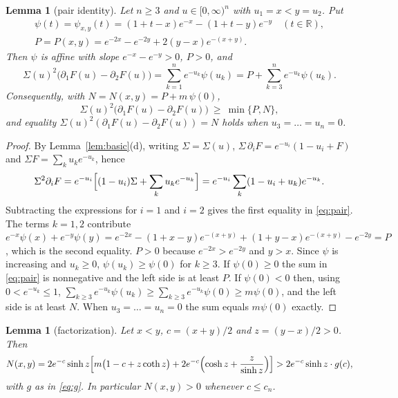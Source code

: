 \documentclass[11pt,a4paper]{article}
\theoremstyle{plain}
\newtheorem{lemma}[theorem]{Lemma}
\theoremstyle{definition}
\newcommand{\R}{\mathbb{R}}
\begin{document}
\begin{lemma}[pair identity]\label{lem:pair}
Let $n\ge 3$ and $u\in[0,\infty)^n$ with $u_1=x<y=u_2$. Put
\begin{gather*}
\psi(t)=\psi_{x,y}(t)=(1+t-x)e^{-x}-(1+t-y)e^{-y}\quad(t\in\R),\\
P=P(x,y)=e^{-2x}-e^{-2y}+2(y-x)e^{-(x+y)} .
\end{gather*}
Then $\psi$ is affine with slope $e^{-x}-e^{-y}>0$, $P>0$, and
\begin{equation}\label{eq:pair}
\Sigma(u)^2\bigl(\partial_1F(u)-\partial_2F(u)\bigr)=\sum_{k=1}^n e^{-u_k}\psi(u_k)=P+\sum_{k=3}^n e^{-u_k}\psi(u_k).
\end{equation}
Consequently, with $N=N(x,y)=P+m\,\psi(0)$,
\begin{equation}\label{eq:pair-bound}
\Sigma(u)^2\bigl(\partial_1F(u)-\partial_2F(u)\bigr)\ \ge\ \min\{P,N\},
\end{equation}
and equality $\Sigma(u)^2(\partial_1F(u)-\partial_2F(u))=N$ holds when $u_3=\dots=u_n=0$.
\end{lemma}

\begin{proof}
By Lemma~\ref{lem:basic}(d), writing $\Sigma=\Sigma(u)$, $\Sigma\,\partial_iF=e^{-u_i}(1-u_i+F)$ and $\Sigma F=\sum_k u_ke^{-u_k}$, hence
\[
\Sigma^2\partial_iF=e^{-u_i}\Bigl[(1-u_i)\Sigma+\sum_k u_ke^{-u_k}\Bigr]=e^{-u_i}\sum_k(1-u_i+u_k)e^{-u_k}.
\]
Subtracting the expressions for $i=1$ and $i=2$ gives the first equality in \eqref{eq:pair}. The terms $k=1,2$ contribute $e^{-x}\psi(x)+e^{-y}\psi(y)=e^{-2x}-(1+x-y)e^{-(x+y)}+(1+y-x)e^{-(x+y)}-e^{-2y}=P$, which is the second equality. $P>0$ because $e^{-2x}>e^{-2y}$ and $y>x$. Since $\psi$ is increasing and $u_k\ge 0$, $\psi(u_k)\ge\psi(0)$ for $k\ge 3$. If $\psi(0)\ge 0$ the sum in \eqref{eq:pair} is nonnegative and the left side is at least $P$. If $\psi(0)<0$ then, using $0<e^{-u_k}\le 1$, $\sum_{k\ge 3}e^{-u_k}\psi(u_k)\ge\sum_{k\ge 3}e^{-u_k}\psi(0)\ge m\psi(0)$, and the left side is at least $N$. When $u_3=\dots=u_n=0$ the sum equals $m\psi(0)$ exactly.
\end{proof}

\begin{lemma}[factorization]\label{lem:factor}
Let $x<y$, $c=(x+y)/2$ and $z=(y-x)/2>0$. Then
\begin{equation}\label{eq:factor}
N(x,y)=2e^{-c}\sinh z\Bigl[m\bigl(1-c+z\coth z\bigr)+2e^{-c}\Bigl(\cosh z+\frac{z}{\sinh z}\Bigr)\Bigr]>2e^{-c}\sinh z\cdot g(c),
\end{equation}
with $g$ as in \eqref{eq:g}. In particular $N(x,y)>0$ whenever $c\le c_n$.
\end{lemma}
\end{document}
